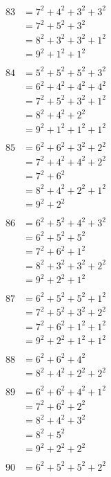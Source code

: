 \documentclass{article}
\numberwithin{equation}{section}
\begin{document}
\begin{multicols}{3}
\noindent
\begin{align*}
83 & = 7^2 + 4^2 + 3^2 + 3^2\\
   & = 7^2 + 5^2 + 3^2\\
   & = 8^2 + 3^2 + 3^2 + 1^2\\
   & = 9^2 + 1^2 + 1^2\\
\\
84 & = 5^2 + 5^2 + 5^2 + 3^2\\
   & = 6^2 + 4^2 + 4^2 + 4^2\\
   & = 7^2 + 5^2 + 3^2 + 1^2\\
   & = 8^2 + 4^2 + 2^2\\
   & = 9^2 + 1^2 + 1^2 + 1^2\\
\\
85 & = 6^2 + 6^2 + 3^2 + 2^2\\
   & = 7^2 + 4^2 + 4^2 + 2^2\\
   & = 7^2 + 6^2\\
   & = 8^2 + 4^2 + 2^2 + 1^2\\
   & = 9^2 + 2^2\\
\\
86 & = 6^2 + 5^2 + 4^2 + 3^2\\
   & = 6^2 + 5^2 + 5^2\\
   & = 7^2 + 6^2 + 1^2\\
   & = 8^2 + 3^2 + 3^2 + 2^2\\
   & = 9^2 + 2^2 + 1^2\\
\\
87 & = 6^2 + 5^2 + 5^2 + 1^2\\
   & = 7^2 + 5^2 + 3^2 + 2^2\\
   & = 7^2 + 6^2 + 1^2 + 1^2\\
   & = 9^2 + 2^2 + 1^2 + 1^2\\
\\
88 & = 6^2 + 6^2 + 4^2\\
   & = 8^2 + 4^2 + 2^2 + 2^2\\
\\
89 & = 6^2 + 6^2 + 4^2 + 1^2\\
   & = 7^2 + 6^2 + 2^2\\
   & = 8^2 + 4^2 + 3^2\\
   & = 8^2 + 5^2\\
   & = 9^2 + 2^2 + 2^2\\
\end{align*}
\vspace{\fill}\columnbreak
\begin{align*}
90 & = 6^2 + 5^2 + 5^2 + 2^2\\

\end{align*}
\end{multicols}
\end{document}
